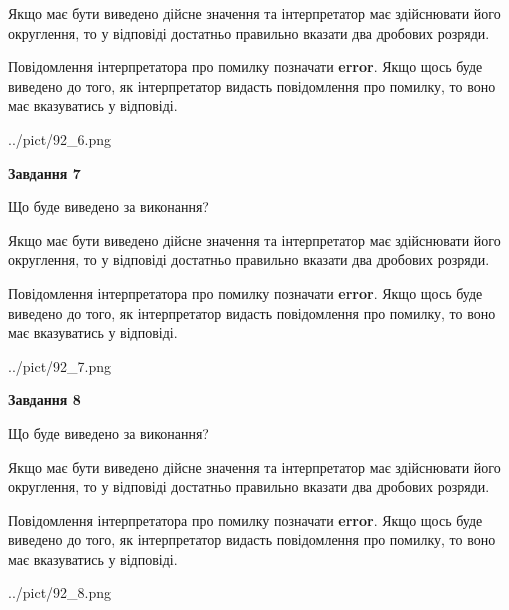 \documentclass[12pt, ukrainian]{article}
\begin{document}
{\begin {Large}
Якщо має бути виведено дійсне значення та інтерпретатор має здійснювати його округлення, 
то у відповіді достатньо правильно вказати два дробових розряди.

Повідомлення інтерпретатора про помилку позначати \textbf{error}.
Якщо щось буде виведено до того, як інтерпретатор видасть повідомлення про помилку, 
то воно має вказуватись у відповіді. \par

\begin{center}
	{../pict/92_6.png}
\end{center}
\newpage

{\begin {center}\textbf{Завдання 7}\end {center}}\par
Що буде виведено за виконання? \par

Якщо має бути виведено дійсне значення та інтерпретатор має здійснювати його округлення, 
то у відповіді достатньо правильно вказати два дробових розряди.

Повідомлення інтерпретатора про помилку позначати \textbf{error}.
Якщо щось буде виведено до того, як інтерпретатор видасть повідомлення про помилку, 
то воно має вказуватись у відповіді. \par

\begin{center}
	{../pict/92_7.png}
\end{center}
\newpage

{\begin {center}\textbf{Завдання 8}\end {center}}\par
Що буде виведено за виконання? \par

Якщо має бути виведено дійсне значення та інтерпретатор має здійснювати його округлення, 
то у відповіді достатньо правильно вказати два дробових розряди.

Повідомлення інтерпретатора про помилку позначати \textbf{error}.
Якщо щось буде виведено до того, як інтерпретатор видасть повідомлення про помилку, 
то воно має вказуватись у відповіді. \par

\begin{center}
	{../pict/92_8.png}
\end{center}
\newpage


\end{Large}}
\end{document}
